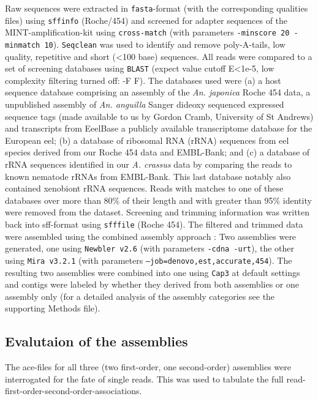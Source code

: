 Raw sequences were extracted in \texttt{fasta}-format (with the
corresponding qualities files) using \texttt{sffinfo} (Roche/454) and
screened for adapter sequences of the MINT-amplification-kit using
\texttt{cross-match} \cite{PHRAP} (with parameters \texttt{-minscore
  20 -minmatch 10}). \texttt{Seqclean} \cite{tgicl_pertea} was used to
identify and remove poly-A-tails, low quality, repetitive and short
(<100 base) sequences. All reads were compared to a set of screening
databases using \texttt{BLAST} (expect value cutoff E<1e-5, low
complexity filtering turned off: -F F). The databases used were (a) a
host sequence database comprising an assembly of the
\textit{An. japonica} Roche 454 data, a unpublished assembly of
\textit{An. anguilla} Sanger dideoxy sequenced expressed sequence tags
(made available to us by Gordon Cramb, University of St Andrews) and
transcripts from EeelBase \cite{pmid21080939} a publicly available
transcriptome database for the European eel; (b) a database of
ribosomal RNA (rRNA) sequences from eel species derived from our Roche
454 data and EMBL-Bank; and (c) a database of rRNA sequences
identified in our \textit{A. crassus} data by comparing the reads to
known nematode rRNAs from EMBL-Bank. This last database notably also
contained xenobiont rRNA sequences. Reads with matches to one of these
databases over more than 80\% of their length and with greater than
95\% identity were removed from the dataset. Screening and trimming
information was written back into sff-format using \texttt{sfffile}
(Roche 454). The filtered and trimmed data were assembled using the
combined assembly approach \cite{pmid20950480}: Two assemblies were
generated, one using \texttt{Newbler v2.6} \cite{pmid16056220} (with
parameters \texttt{-cdna -urt}), the other using \texttt{Mira v3.2.1}
\cite{miraEST} (with parameters
\texttt{--job=denovo,est,accurate,454}). The resulting two assemblies
were combined into one using \texttt{Cap3} \cite{Cap3_Huang} at
default settings and contigs were labeled by whether they derived from
both assemblies or one assembly only (for a detailed analysis of the
assembly categories see the supporting Methods file).

\subsection{Evalutaion of the assemblies}

The ace-files for all three (two first-order, one second-order)
assemblies were interrogated for the fate of single reads. This was
used to tabulate the full read-first-order-second-order-associations.

